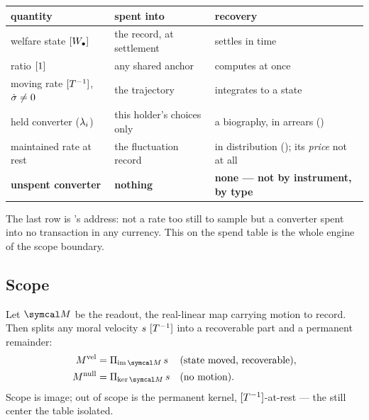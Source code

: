 \documentclass[../main]{subfiles}
\begin{document}
\begin{table}[htbp]
  \centering
  \begin{tabularx}{\textwidth}{@{} L L L @{}}
    \toprule
    \textbf{quantity} & \textbf{spent into} & \textbf{recovery} \\
    \midrule
    welfare state $[W\sb{\bullet}]$ & the record, at settlement & settles in time \\
    ratio $[1]$ & any shared anchor & computes at once \\
    moving rate $[T\sp{-1}]$,\ $\dot{\sigma}\neq0$ & the trajectory & integrates to a state \\
    held converter ($\lambda\sb{i}$) & this holder's choices only
      & a biography, in arrears () \\
    maintained rate at rest & the fluctuation record
      & in distribution (); its \emph{price} not at all \\
    \textbf{unspent converter} & \textbf{nothing}
      & \textbf{none --- not by instrument, by type} \\
    \bottomrule
  \end{tabularx}
\end{table}

The last row is 's address: not a rate too still to sample but a converter
spent into no transaction in any currency. This  on the spend table is the
whole engine of the scope boundary.


\subsection{Scope}
\label{subsec:epi:scope}
%
Let $\readout$ be the readout, the real-linear map carrying motion to record. Then
 splits any moral velocity $s\ [T\sp{-1}]$ into a recoverable part and a permanent
remainder:%
\begin{align}
  \moralvelocity  &=\Pi_{\mathrm{im}\,\readout}\,\moralvel && (\text{state moved, recoverable}),
    \label{eq:epi:vel}\\
  \moralnull &=\Pi_{\ker\readout}\,\moralvel          && (\text{no motion}).
    \label{eq:epi:null}
\end{align}
Scope is image; out of scope is the permanent kernel, $[T\sp{-1}]$-at-rest --- the still
center the table isolated.
\end{document}
